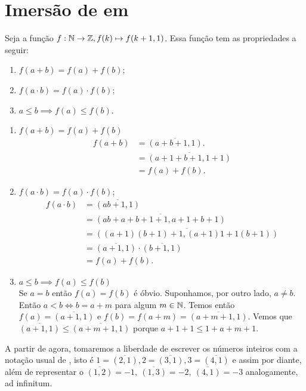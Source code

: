 \documentclass[../main.tex]{subfiles}
\begin{document}
\section{Imersão de \N em \Z}
\begin{teo}
    Seja a função $f: \mathbb{N} \rightarrow \mathbb{Z}, f(k) \mapsto f(k+1, 1)$. Essa função tem as propriedades a seguir:
    \begin{enumerate}[label=(\roman*)]
        \item $f(a + b) = f(a) + f(b)$;
        \item $f(a \cdot b) = f(a) \cdot f(b)$;
        \item $a \leq b \implies f(a) \leq f(b)$.
    \end{enumerate}
\end{teo}
\begin{dem}
    \begin{enumerate}[label=(\roman*)]
        \item $f(a + b) = f(a) + f(b)$\\
        \begin{align*}
            f(a + b) &= \overline{(a+b+1, 1)}. \\
                     &= \overline{(a+1+b+1, 1+1)} \\
                     &= f(a) + f(b).
        \end{align*}
    
        \item $f(a \cdot b) = f(a) \cdot f(b)$;
        \begin{align*}
            f(a \cdot b) &= \overline{(ab+1, 1)}\\
                        &= \overline{(ab+a+b+1+1, a+1+b+1)}\\
                        &= \overline{((a+1)(b+1)+1, (a+1)1 + 1(b+1))}\\
                        &= \overline{(a+1,1)} \cdot \overline{(b+1,1)}\\
                        &= f(a) + f(b).
        \end{align*}        
        
        \item $a \leq b \implies f(a) \leq f(b)$ \\
        Se $a=b$ então $f(a)=f(b)$ é óbvio. Suponhamos, por outro lado, $a \neq b$.
        Então $a<b \iff b=a+m$ para algum $m \in \mathbb{N}$.
        Temos então $f(a) = \overline{(a+1,1)}$ e $f(b) = f(a+m) = \overline{(a+m+1,1)}$.
        Vemos que $\overline{(a+1,1)} \leq \overline{(a+m+1,1)}$ porque $a+1+1 \leq 1 + a + m + 1$.
    \end{enumerate}
\end{dem}
\begin{obs}
    A partir de agora, tomaremos a liberdade de escrever os números inteiros com a notação usual de \N, isto é $1 = \overline{(2,1)}, 2 = \overline{(3,1)}, 3 = \overline{(4,1)}$ e assim por diante, além de representar o $\overline{(1,2)} = -1,\ \overline{(1,3)} = -2,\ \overline{(4,1)} = -3$ analogamente, ad infinitum.
\end{obs}
\end{document}
